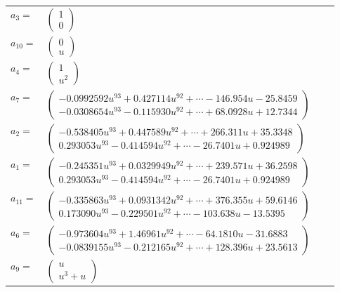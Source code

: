 \documentclass[1p]{elsarticle_modified}
\theoremstyle{definition}
\begin{document}
\begin{tabular}{m{7pt} m{180pt} m{7pt} m{180pt} }
\flushright $a_{3}=$&$\begin{pmatrix}1\\0\end{pmatrix}$ \\
\flushright $a_{10}=$&$\begin{pmatrix}0\\u\end{pmatrix}$ \\
\flushright $a_{4}=$&$\begin{pmatrix}1\\u^2\end{pmatrix}$ \\
\flushright $a_{7}=$&$\begin{pmatrix}-0.0992592 u^{93}+0.427114 u^{92}+\cdots-146.954 u-25.8459\\-0.0308654 u^{93}-0.115930 u^{92}+\cdots+68.0928 u+12.7344\end{pmatrix}$ \\
\flushright $a_{2}=$&$\begin{pmatrix}-0.538405 u^{93}+0.447589 u^{92}+\cdots+266.311 u+35.3348\\0.293053 u^{93}-0.414594 u^{92}+\cdots-26.7401 u+0.924989\end{pmatrix}$ \\
\flushright $a_{1}=$&$\begin{pmatrix}-0.245351 u^{93}+0.0329949 u^{92}+\cdots+239.571 u+36.2598\\0.293053 u^{93}-0.414594 u^{92}+\cdots-26.7401 u+0.924989\end{pmatrix}$ \\
\flushright $a_{11}=$&$\begin{pmatrix}-0.335863 u^{93}+0.0931342 u^{92}+\cdots+376.355 u+59.6146\\0.173090 u^{93}-0.229501 u^{92}+\cdots-103.638 u-13.5395\end{pmatrix}$ \\
\flushright $a_{6}=$&$\begin{pmatrix}-0.973604 u^{93}+1.46961 u^{92}+\cdots-64.1810 u-31.6883\\-0.0839155 u^{93}-0.212165 u^{92}+\cdots+128.396 u+23.5613\end{pmatrix}$ \\
\flushright $a_{9}=$&$\begin{pmatrix}u\\u^3+u\end{pmatrix}$ \\

\end{tabular}
\end{document}
